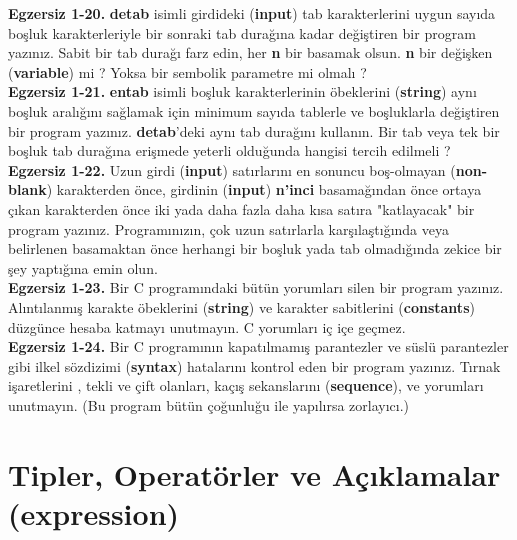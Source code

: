 \documentclass[a4paper,12pt,oneside]{book}
\begin{document}
\noindent \textbf{Egzersiz 1-20.} \textbf{detab} isimli girdideki (\textbf{input}) tab karakterlerini uygun sayıda boşluk karakterleriyle bir sonraki tab durağına kadar değiştiren bir program yazınız. Sabit bir tab durağı farz edin, her \textbf{n} bir basamak olsun. \textbf{n} bir değişken (\textbf{variable}) mi ? Yoksa bir sembolik parametre mi olmalı ?\\

\noindent \textbf{Egzersiz 1-21.} \textbf{entab} isimli boşluk karakterlerinin öbeklerini (\textbf{string}) aynı boşluk aralığını sağlamak için minimum sayıda tablerle ve boşluklarla değiştiren bir program yazınız. \textbf{detab}'deki aynı tab durağını kullanın. Bir tab veya tek bir boşluk tab durağına erişmede yeterli olduğunda hangisi tercih edilmeli ? \\

\noindent \textbf{Egzersiz 1-22.} Uzun girdi (\textbf{input}) satırlarını en sonuncu boş-olmayan (\textbf{non-blank}) karakterden önce, girdinin (\textbf{input}) \textbf{n'inci} basamağından önce ortaya çıkan karakterden önce iki yada daha fazla daha kısa satıra "katlayacak" bir program yazınız. Programınızın, çok uzun satırlarla karşılaştığında veya belirlenen basamaktan önce herhangi bir boşluk yada tab olmadığında zekice bir şey yaptığına emin olun. \\

\noindent \textbf{Egzersiz 1-23.} Bir C programındaki bütün yorumları silen bir program yazınız. Alıntılanmış karakte öbeklerini (\textbf{string}) ve karakter sabitlerini (\textbf{constants}) düzgünce hesaba katmayı unutmayın. C yorumları iç içe geçmez. \\

\noindent \textbf{Egzersiz 1-24.} Bir C programının kapatılmamış parantezler ve süslü parantezler gibi ilkel sözdizimi (\textbf{syntax}) hatalarını kontrol eden bir program yazınız. Tırnak işaretlerini , tekli ve çift olanları, kaçış sekanslarını (\textbf{sequence}), ve yorumları unutmayın. (Bu program bütün çoğunluğu ile yapılırsa zorlayıcı.)\\

\chapter{Tipler, Operatörler ve Açıklamalar (expression)}
\end{document}
